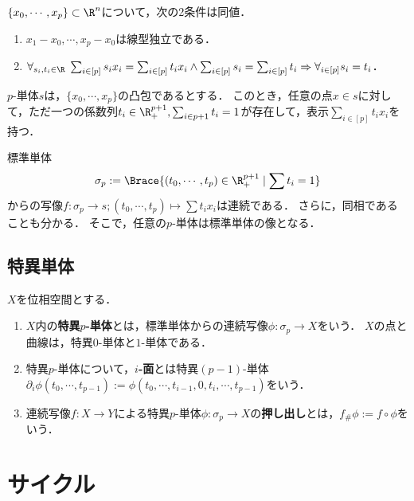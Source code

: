 \documentclass[uplatex, dvipdfmx]{jsreport}
\begin{document}
\begin{proposition}[単体の特徴付け]
    $\{x_0,\cdots,x_p\}\subset\R^n$について，次の2条件は同値．
    \begin{enumerate}
        \item $x_1-x_0,\cdots,x_p-x_0$は線型独立である．
        \item $\forall_{s_i,t_i\in\R}\;\sum_{i\in[p]}s_ix_i=\sum_{i\in[p]}t_ix_i\land\sum_{i\in[p]}s_i=\sum_{i\in[p]}t_i\Rightarrow\forall_{i\in[p]}s_i=t_i$．
    \end{enumerate}
\end{proposition}

\begin{corollary}
    $p$-単体$s$は，$\{x_0,\cdots,x_p\}$の凸包であるとする．
    このとき，任意の点$x\in s$に対して，ただ一つの係数列$t_i\in\R_+^{p+1},\sum_{i\in p+1}t_i=1$が存在して，表示$\sum_{i\in[p]}t_ix_i$を持つ．
\end{corollary}
\begin{remarks}
    標準単体
    \[\sigma_p:=\Brace{(t_0,\cdots,t_p)\in\R_+^{p+1}\mid\sum t_i=1}\]
    からの写像$f:\sigma_p\to s;(t_0,\cdots,t_p)\mapsto\sum t_ix_i$は連続である．
    さらに，同相であることも分かる．
    そこで，任意の$p$-単体は標準単体の像となる．
\end{remarks}

\subsection{特異単体}

\begin{definition}
    $X$を位相空間とする．
    \begin{enumerate}
        \item $X$内の\textbf{特異$p$-単体}とは，標準単体からの連続写像$\phi:\sigma_p\to X$をいう．
        $X$の点と曲線は，特異$0$-単体と$1$-単体である．
        \item 特異$p$-単体について，\textbf{$i$-面}とは特異$(p-1)$-単体$\partial_i\phi(t_0,\cdots,t_{p-1}):=\phi(t_0,\cdots,t_{i-1},0,t_i,\cdots,t_{p-1})$をいう．
        \item 連続写像$f:X\to Y$による特異$p$-単体$\phi:\sigma_p\to X$の\textbf{押し出し}とは，$f_\#\phi:=f\circ\phi$をいう．
    \end{enumerate}
\end{definition}

\section{サイクル}
\end{document}
